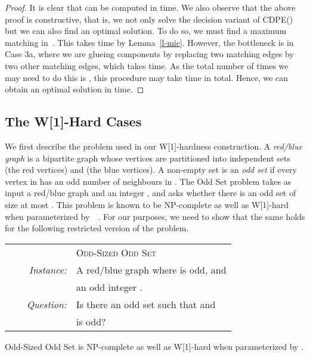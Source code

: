 \documentclass[11pt]{llncs}
\newcommand{\cdpe}{{\sc CDPE}}
\newcommand{\NP}{{\sf NP}}
\newcommand{\W}{{\sf W[1]}}
\begin{document}
\begin{proof}
\medskip
\noindent
It is clear that  can be computed in  time.  We also
observe that the above proof is constructive, that is, we not only solve the
decision variant of \cdpe() but we can also find an optimal solution.
To do so, we must find a maximum matching in~. This takes
 time by Lemma~\ref{l-mic}.
However, the bottleneck is in Case 3a, where we are glueing components by replacing two matching edges by two other matching edges, which takes  time.
As the total number of times we may need to do this is , this procedure may take  time in total.
Hence, we can obtain an optimal solution in
 time.
\end{proof}

\subsection{The \W-Hard Cases}\label{s-wun}

We first describe the problem used in our \W-hardness construction.
A {\em red/blue graph} is a bipartite graph  whose
vertices are partitioned into independent sets  (the red vertices)
and  (the blue vertices). A non-empty set  is an
{\em odd set} if every vertex in  has an odd number of neighbours in
. The {\sc Odd Set} problem takes as input a red/blue graph  and an integer , and asks whether there is an odd set
 of size at most . This problem is known to be
\NP-complete as well as \W-hard when parameterized
by~~\cite{DowneyFVW99}. For our purposes, we need to show that the same
holds for the following restricted version of the problem.

\begin{center}
\begin{boxedminipage}{.99\textwidth}
\begin{tabular}{rl}
& \textsc{Odd-Sized Odd Set}\\
\textit{~~~~Instance:} & A red/blue graph  where  is odd, and\\
                       & an odd integer .\\
\textit{Question:} & Is there an odd set  such that  and \\ & is odd?\\
\end{tabular}
\end{boxedminipage}
\end{center}

\begin{lemma}
\label{l-oddsized}
{\sc Odd-Sized Odd Set} is \NP-complete as well as \W-hard when
parameterized by .
\end{lemma}
\end{document}

